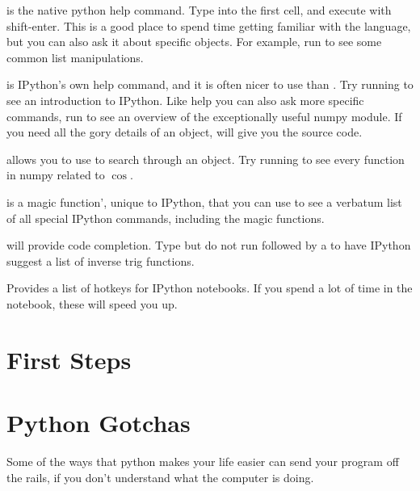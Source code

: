 \documentclass[justified, nobib]{tufte-handout}
\begin{document}
\begin{description}[font=\tt, leftmargin=0cm]

  \item[\ipythoninline{help()}] is the native python help command.
  Type  into the first cell, and execute with
  shift-enter.
  This is a good place to spend time getting familiar with the language, but
  you can also ask it about specific objects.
  For example, run  to see some common list
  manipulations.

  \item[\ipythoninline{?}] is IPython's own help command, and it is often nicer
  to use than .
  Try running  to see an introduction to IPython.
  Like help you can also ask more specific commands, run
   to see an overview of the exceptionally
  useful numpy module.
  If you need all the gory details of an object,  will
  give you the source code.

  \item[\textinline{<regex>}\ipythoninline{?}] allows you to use
   to search through an object.
  Try running  to see every function in numpy
  related to $\cos$.

  \item[\ipythoninline{\%quickref}] is a magic function', unique to IPython,
  that you can use to see a verbatum list of all special IPython commands,
  including the magic functions.

  \item[\textinline{<tab>}] will provide code completion.
  Type but do not run  followed by a
   to have IPython suggest a list of inverse trig functions.

  \item[\textinline{Control-m h}] Provides a list of hotkeys for IPython
  notebooks.
  If you spend a lot of time in the notebook, these will speed you up.

\end{description}

\pagebreak
\section*{First Steps}


\pagebreak

\section*{Python Gotchas}
Some of the ways that python makes your life easier can send your program off
the rails, if you don't understand what the computer is doing.
\end{document}
